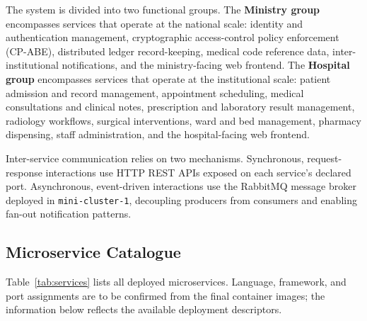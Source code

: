\documentclass[12pt,a4paper]{report}
\begin{document}
The system is divided into two functional groups. The \textbf{Ministry group}
encompasses services that operate at the national scale: identity and authentication
management, cryptographic access-control policy enforcement (CP-ABE), distributed
ledger record-keeping, medical code reference data, inter-institutional notifications,
and the ministry-facing web frontend. The \textbf{Hospital group} encompasses
services that operate at the institutional scale: patient admission and record
management, appointment scheduling, medical consultations and clinical notes,
prescription and laboratory result management, radiology workflows, surgical
interventions, ward and bed management, pharmacy dispensing, staff administration,
and the hospital-facing web frontend.

Inter-service communication relies on two mechanisms. Synchronous, request-response
interactions use HTTP REST APIs exposed on each service's declared port. Asynchronous,
event-driven interactions use the RabbitMQ message broker deployed in
\texttt{mini-cluster-1}, decoupling producers from consumers and enabling fan-out
notification patterns.

\subsection{Microservice Catalogue}

Table~\ref{tab:services} lists all deployed microservices. Language, framework, and
port assignments are to be confirmed from the final container images; the information
below reflects the available deployment descriptors.
\end{document}
